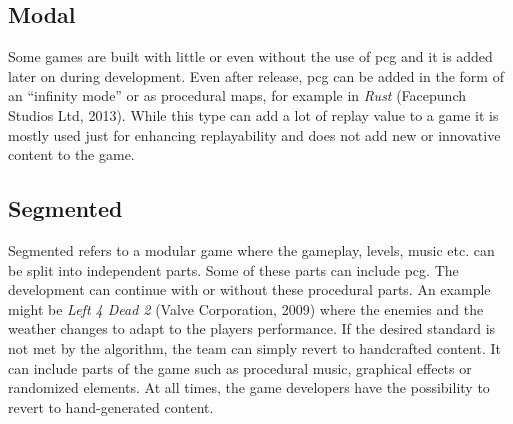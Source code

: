 \documentclass[10pt,a4paper]{article}
\begin{document}
\subsection{Modal}
\begin{multicols}{2} Some games are built with little or even without the use of \gls{pcg} and it is added later on during development. Even after release, \gls{pcg} can be added in the form of an “infinity mode” or as procedural maps, for example in \textit{Rust} (Facepunch Studios Ltd, 2013). While this type can add a lot of replay value to a game it is mostly used just for enhancing replayability and does not add new or innovative content to the game.
\end{multicols}
\subsection{Segmented}
\begin{multicols}{2} Segmented refers to a modular game where the gameplay, levels, music etc. can be split into independent parts. Some of these parts can include \gls{pcg}. The development can continue with or without these procedural parts. An example might be \textit{Left 4 Dead 2} (Valve Corporation, 2009) where the enemies and the weather changes to adapt to the players performance. If the desired standard is not met by the algorithm, the team can simply revert to handcrafted content. It can include parts of the game such as procedural music, graphical effects or randomized elements. At all times, the game developers have the possibility to revert to hand-generated content.
\end{multicols}
\end{document}
